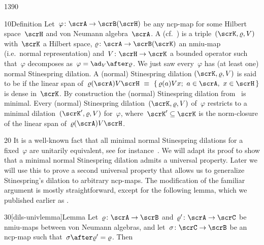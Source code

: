 \begin{parsec}{1390}%
\begin{point}{10}{Definition}%
Let~$\varphi\colon \scrA \to \scrB(\scrH)$
    be any ncp-map
    for some Hilbert space~$\scrH$ and von Neumann algebra~$\scrA$.
    A 
        (cf.~\cite[ch.~4]{paulsen})
    is a triple~$(\scrK,\varrho, V)$
    with~$\scrK$ a Hilbert space,
    $\varrho\colon \scrA \to \scrB(\scrK)$ an nmiu-map
        (i.e.~normal representation)
        and~$V\colon \scrH \to \scrK$ a bounded operator
        such that~$\varphi$ decomposes as~$\varphi = \ad_V \after \varrho$.
    We just saw every~$\varphi$ has (at least one)
        normal Stinespring dilation.
    A (normal) Stinespring dilation
$(\scrK,\varrho,V)$ is said to be 
    if the linear span of~$\varrho(\scrA)V\scrH
        \ \equiv \ \{ \,\varrho(a) Vx; \ a \in \scrA,\ x\in \scrH\,\}$
is dense in~$\scrK$.
By construction the (normal) Stinespring dilation
    from~ is minimal.
Every (normal) Stinespring dilation~$(\scrK, \varrho, V)$
    of~$\varphi$
    restricts to a minimal dilation~$(\scrK', \varrho,V)$
    for~$\varphi$, where~$\scrK' \subseteq \scrK$
    is the norm-closure of the linear span of~$\varrho(\scrA)V\scrH$.
\end{point}
\begin{point}{20}%
It is a well-known fact that all minimal normal Stinespring dilations
    for a fixed~$\varphi$ are unitarily equivalent,
    see for instance~\cite[prop.~4.2]{paulsen}.
We will adapt its proof to show that a minimal normal Stinespring
    dilation admits a universal property.
Later we will use this to prove a second universal property 
    that allows us to generalize Stinespring's dilation to
    arbitrary ncp-maps.
The modification of the familiar argument
    is mostly straightforward, except for the following lemma,
    which we published earlier as \cite[lem.~11]{wwpaschke}.
\end{point}
\spacingfix{} %
\begin{point}{30}[dils-univlemma]{Lemma}%
Let~$\varrho\colon \scrA \to \scrB$ and~$\varrho'\colon \scrA \to \scrC$
    be nmiu-maps between von Neumann algebras,
        and let~$\sigma \colon \scrC \to \scrB$ be an ncp-map
        such that~$\sigma \after \varrho' = \varrho$. Then

\end{point}
\end{parsec}

